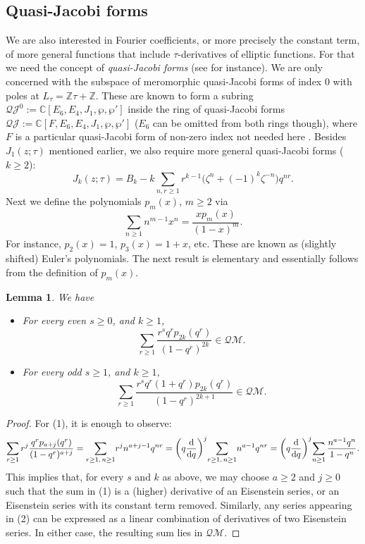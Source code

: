 \documentclass[pdftex]{sigma}
\numberwithin{equation}{section}
\newtheorem{Lemma}[Theorem]{Lemma}
\theoremstyle{definition}
\begin{document}
\subsection{Quasi-Jacobi forms}\label{section3.2}
We are also interested in Fourier coefficients, or more precisely the constant term, of more general functions that include $\tau$-derivatives of elliptic
functions. For that we need the concept of {\em quasi-Jacobi forms} (see \cite{Libgober,Ob, Ittersum} for instance).
We are only concerned with the subspace of meromorphic quasi-Jacobi forms of index $0$ with poles at $L_\tau=\mathbb{Z}\tau+\mathbb{Z}$. These are known to form a subring $\mathcal{QJ}^0:=\mathbb{C}[E_6,E_4,J_1,\wp,\wp']$ inside the ring of quasi-Jacobi forms $\mathcal{QJ}:=\mathbb{C}[F,E_6,E_4,J_1,\wp,\wp']$ ($E_6$ can be omitted from both rings though), where $F$ is a particular quasi-Jacobi form of non-zero index not needed here \cite{Ob}. Besides $J_1(z;\tau)$ mentioned earlier, we also require more general quasi-Jacobi forms ($k \geq 2$):
\[
J_k(z;\tau)=B_k - k \sum_{n, r \geq 1} r^{k-1}\bigl( \zeta^n + (-1)^k \zeta^{-n}\bigr) q^{nr}.
\]
Next we define the polynomials $p_m(x)$, $m \geq 2$ via
\[
\sum_{n \geq 1} n^{m-1} x^n=\frac{x p_{m}(x)}{(1-x)^{m}}.
\]
For instance, $p_2(x)=1$, $p_3(x)=1+x$, etc.
These are known as (slightly shifted) Euler's polynomials. The next result is elementary and essentially follows from the definition of $p_m(x)$.
\begin{Lemma} \label{euler} We have
\begin{itemize}\itemsep=0pt
\item[$(1)$] For every even $s \geq 0$, and $k \geq 1$,
\[
\sum_{r \geq 1} \frac{r^s q^r p_{2k}(q^r)}{(1-q^r)^{2k}} \in \mathcal{QM}.
\]
\item[$(2)$] For every odd $s \geq 1$, and $k \geq 1$,
\[
\sum_{r \geq 1} \frac{r^s q^r (1+q^r) p_{2k}(q^r)}{(1-q^r)^{2k+1}} \in \mathcal{QM}.
\]
\end{itemize}
\end{Lemma}
\begin{proof} For (1), it is enough to observe:
\begin{align*}
 \sum_{r \geq 1} r^j \frac{q^r p_{a+j}(q^r)}{(1-q^r)^{a+j}}= \sum_{r \geq 1,\, n \geq 1}\! r^j n^{a+j-1} q^{n r}= \left(q \frac{{\rm d}}{{\rm d}q} \right)^j \! \sum_{r \geq 1,\, n \geq 1}\! n^{a-1} q^{n r} =\left(q \frac{{\rm d}}{{\rm d}q}\right)^j\! \sum_{n \geq 1} \frac{n^{a-1} q^n}{1-q^n}.
\end{align*}
This implies that, for every $s$ and $k$ as above, we may choose $a \geq 2$ and $j \geq 0$ such that the sum in (1) is a (higher) derivative of an Eisenstein series, or an Eisenstein series with its constant term removed.
Similarly, any series appearing in (2) can be expressed as a linear combination of derivatives of two Eisenstein series.
In either case, the resulting sum lies in $\mathcal{QM}$.
\end{proof}
\end{document}

